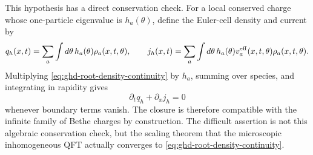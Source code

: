 This hypothesis has a direct conservation check.  For a local conserved
charge whose one-particle eigenvalue is \(h_a(\theta)\), define the Euler-cell
density and current by
\begin{equation}
  q_h(x,t)
  =
  \sum_a\int d\theta\,h_a(\theta)\rho_a(x,t,\theta),
  \qquad
  j_h(x,t)
  =
  \sum_a\int d\theta\,h_a(\theta)
  v_a^{\rm eff}(x,t,\theta)\rho_a(x,t,\theta).
  \label{eq:ghd-charge-current}
\end{equation}
Multiplying \eqref{eq:ghd-root-density-continuity} by \(h_a\), summing over
species, and integrating in rapidity gives
\[
  \partial_t q_h+\partial_xj_h=0
\]
whenever boundary terms vanish.  The closure is therefore compatible with the
infinite family of Bethe charges by construction.  The difficult assertion is
not this algebraic conservation check, but the scaling theorem that the
microscopic inhomogeneous QFT actually converges to
\eqref{eq:ghd-root-density-continuity}.

